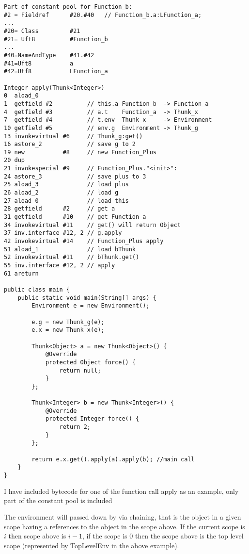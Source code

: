 \documentclass[12pt,a4paper,twoside]{article}
\begin{document}
\begin{verbatim}
Part of constant pool for Function_b:
#2 = Fieldref      #20.#40   // Function_b.a:LFunction_a;
...
#20= Class         #21
#21= Uft8          #Function_b
...
#40=NameAndType    #41.#42
#41=Uft8           a
#42=Utf8           LFunction_a

Integer apply(Thunk<Integer>)
0  aload_0
1  getfield #2          // this.a Function_b  -> Function_a
4  getfield #3          // a.t    Function_a  -> Thunk_x
7  getfield #4          // t.env  Thunk_x     -> Environment
10 getfield #5          // env.g  Environment -> Thunk_g
13 invokevirtual #6     // Thunk_g:get()
16 astore_2             // save g to 2
19 new           #8     // new Function_Plus
20 dup
21 invokespecial #9     // Function_Plus."<init>":
24 astore_3             // save plus to 3
25 aload_3              // load plus
26 aload_2              // load g
27 aload_0              // load this
28 getfield      #2     // get a
31 getfield      #10    // get Function_a
34 invokevirtual #11    // get() will return Object
37 inv.interface #12, 2 // g.apply
42 invokevirtual #14    // Function_Plus apply
51 aload_1              // load bThunk
52 invokevirtual #11    // bThunk.get()
55 inv.interface #12, 2 // apply
61 areturn 

public class main {
    public static void main(String[] args) {
        Environment e = new Environment();

        e.g = new Thunk_g(e);
        e.x = new Thunk_x(e);

        Thunk<Object> a = new Thunk<Object>() {
            @Override
            protected Object force() {
                return null;
            }
        };

        Thunk<Integer> b = new Thunk<Integer>() {
            @Override
            protected Integer force() {
                return 2;
            }
        };
        
        return e.x.get().apply(a).apply(b); //main call
    }
}
\end{verbatim}

I have included bytecode for one of the function call apply as an example, only part of the constant pool is
included


The environment will passed down by via chaining, that is the object in a given scope
having a references to the object in the scope above. If the current scope is $i$ then scope above is
$i-1$, if the scope is $0$ then the scope above is the top level scope (represented by TopLevelEnv in the above example).
\end{document}
